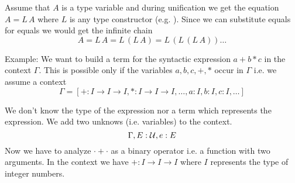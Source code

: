 Assume that $A$ is a type variable and during unification we get the equation
$A = L\, A$ where $L$ is any type constructor (e.g. ). Since we can
substitute equals for equals we would get the infinite chain
$$
  A = L\, A = L\, (L\, A) = L\, (L\, (L\, A)) \ldots
$$



Example: We want to build a term for the syntactic expression $a + b * c$ in
the context $\Gamma$. This is possible only if the variables $a, b, c, +, *$
occur in $\Gamma$ i.e. we assume a context
$$
\Gamma = [+:I\to I\to I, *:I\to I\to I, \ldots, a:I, b:I, c:I, \ldots]
$$


We don't know the type of the expression nor a term which
represents the expression. We add two unknows (i.e. variables) to the context.
%
$$
\Gamma, E: {\cal{U}}, e: E
$$
%
Now we have to analyze $\cdot + \cdot$ as a binary operator i.e. a function
with two arguments. In the context we have $+ : I \to I \to I$ where $I$
represents the type of integer numbers.

